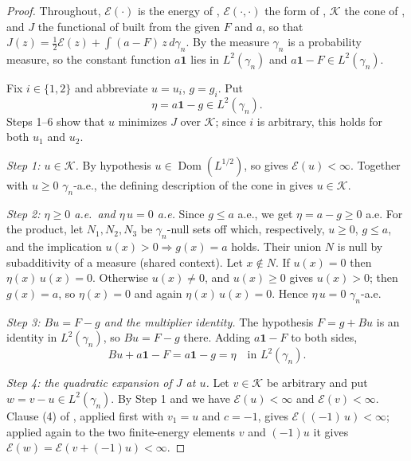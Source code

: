 \begin{proof}
Throughout, $\mathcal{E}(\cdot)$ is the energy of ,
$\mathcal{E}(\cdot,\cdot)$ the form of , $\mathcal{K}$ the
cone of , and $J$ the functional of
 built from the given $F$ and $a$, so that
$J(z) = \tfrac12\mathcal{E}(z) + \int (a - F)\,z \, d\gamma_n$.  By
 the measure $\gamma_n$ is a probability measure, so the
constant function $a\mathbf{1}$ lies in $L^2(\gamma_n)$ and
$a\mathbf{1} - F \in L^2(\gamma_n)$.

Fix $i \in \{1,2\}$ and abbreviate $u = u_i$, $g = g_i$.  Put
\[
  \eta = a\mathbf{1} - g \in L^2(\gamma_n) .
\]
Steps 1--6 show that $u$ minimizes $J$ over $\mathcal{K}$; since $i$ is
arbitrary, this holds for both $u_1$ and $u_2$.

\emph{Step 1: $u \in \mathcal{K}$.}
By hypothesis $u \in \operatorname{Dom}(L^{1/2})$, so
 gives $\mathcal{E}(u) < \infty$.  Together
with $u \geq 0$ $\gamma_n$-a.e., the defining description of the cone in
 gives $u \in \mathcal{K}$.

\emph{Step 2: $\eta \geq 0$ a.e.\ and $\eta\,u = 0$ a.e.}
Since $g \leq a$ a.e., we get $\eta = a - g \geq 0$ a.e.  For the product, let
$N_1, N_2, N_3$ be $\gamma_n$-null sets off which, respectively, $u \geq 0$,
$g \leq a$, and the implication $u(x) > 0 \Rightarrow g(x) = a$ holds.  Their
union $N$ is null by subadditivity of a measure (shared context).  Let
$x \notin N$.  If $u(x) = 0$ then $\eta(x)\,u(x) = 0$.  Otherwise $u(x) \neq 0$,
and $u(x) \geq 0$ gives $u(x) > 0$; then $g(x) = a$, so $\eta(x) = 0$ and again
$\eta(x)\,u(x) = 0$.  Hence $\eta\,u = 0$ $\gamma_n$-a.e.

\emph{Step 3: $Bu = F - g$ and the multiplier identity.}
The hypothesis $F = g + Bu$ is an identity in $L^2(\gamma_n)$, so
$Bu = F - g$ there.  Adding $a\mathbf{1} - F$ to both sides,
\begin{equation*}
  Bu + a\mathbf{1} - F = a\mathbf{1} - g = \eta \quad\text{in } L^2(\gamma_n).
  \tag{$\dagger$}
\end{equation*}

\emph{Step 4: the quadratic expansion of $J$ at $u$.}
Let $v \in \mathcal{K}$ be arbitrary and put $w = v - u \in L^2(\gamma_n)$.  By
Step 1 and  we have $\mathcal{E}(u) < \infty$ and
$\mathcal{E}(v) < \infty$.  Clause (4) of , applied
first with $v_1 = u$ and $c = -1$, gives $\mathcal{E}((-1)\,u) < \infty$; applied
again to the two finite-energy elements $v$ and $(-1)u$ it gives
$\mathcal{E}(w) = \mathcal{E}(v + (-1)u) < \infty$.


\end{proof}
